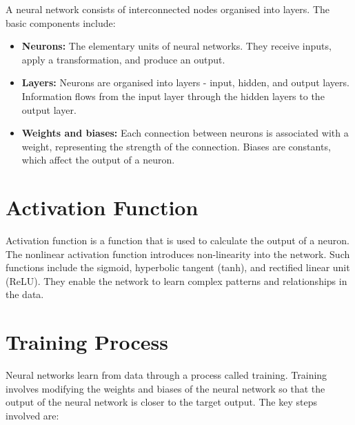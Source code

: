 \documentclass[english, ba, kiv, he, iso690numb, pdf, viewonly]{fasthesis}
\begin{document}
A neural network consists of interconnected nodes organised into layers. The basic components include:

\begin{itemize}
    \item \textbf{Neurons:} The elementary units of neural networks. They receive inputs, apply a transformation, and produce an output. 
    
    \item \textbf{Layers:} Neurons are organised into layers - input, hidden, and output layers. Information flows from the input layer through the hidden layers to the output layer.
    
    \item \textbf{Weights and biases:} Each connection between neurons is associated with a weight, representing the strength of the connection. Biases are constants, which affect the output of a neuron.
\end{itemize}
\section{Activation Function}

Activation function is a function that is used to calculate the output of a neuron. The nonlinear activation function introduces non-linearity into the network. Such functions include the sigmoid, hyperbolic tangent (tanh), and rectified linear unit (ReLU). They enable the network to learn complex patterns and relationships in the data.

\section{Training Process}

Neural networks learn from data through a process called training. Training involves modifying the weights and biases of the neural network so that the output of the neural network is closer to the target output. The key steps involved are:
\end{document}
